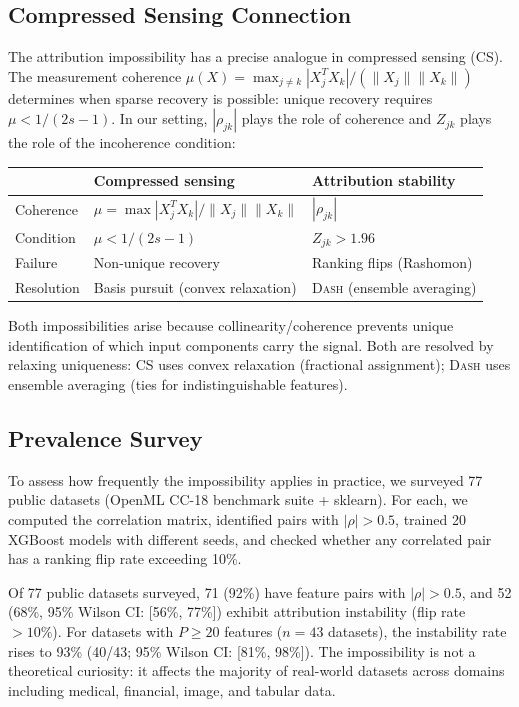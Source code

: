\documentclass{article}
\newcommand{\DASH}{\textsc{Dash}}
\begin{document}
\subsection{Compressed Sensing Connection}

The attribution impossibility has a precise analogue in compressed sensing (CS). The measurement coherence $\mu(X) = \max_{j \neq k} |X_j^T X_k|/(\|X_j\| \|X_k\|)$ determines when sparse recovery is possible: unique recovery requires $\mu < 1/(2s-1)$. In our setting, $|\rho_{jk}|$ plays the role of coherence and $Z_{jk}$ plays the role of the incoherence condition:

\begin{center}
\small
\begin{tabular}{@{}lll@{}}
\toprule
& \textbf{Compressed sensing} & \textbf{Attribution stability} \\
\midrule
Coherence & $\mu = \max |X_j^T X_k|/\|X_j\|\|X_k\|$ & $|\rho_{jk}|$ \\
Condition & $\mu < 1/(2s{-}1)$ & $Z_{jk} > 1.96$ \\
Failure & Non-unique recovery & Ranking flips (Rashomon) \\
Resolution & Basis pursuit (convex relaxation) & \DASH{} (ensemble averaging) \\
\bottomrule
\end{tabular}
\end{center}

Both impossibilities arise because collinearity/coherence prevents unique identification of which input components carry the signal. Both are resolved by relaxing uniqueness: CS uses convex relaxation (fractional assignment); \DASH{} uses ensemble averaging (ties for indistinguishable features).

\subsection{Prevalence Survey}
\label{sec:prevalence}

To assess how frequently the impossibility applies in practice, we surveyed 77 public datasets (OpenML CC-18 benchmark suite + sklearn). For each, we computed the correlation matrix, identified pairs with $|\rho| > 0.5$, trained 20 XGBoost models with different seeds, and checked whether any correlated pair has a ranking flip rate exceeding 10\%.

Of 77 public datasets surveyed, 71 (92\%) have feature pairs with $|\rho| > 0.5$, and 52 (68\%, 95\% Wilson CI: [56\%, 77\%]) exhibit attribution instability (flip rate $> 10\%$). For datasets with $P \geq 20$ features ($n = 43$ datasets), the instability rate rises to 93\% (40/43; 95\% Wilson CI: [81\%, 98\%]). The impossibility is not a theoretical curiosity: it affects the majority of real-world datasets across domains including medical, financial, image, and tabular data.
\end{document}
